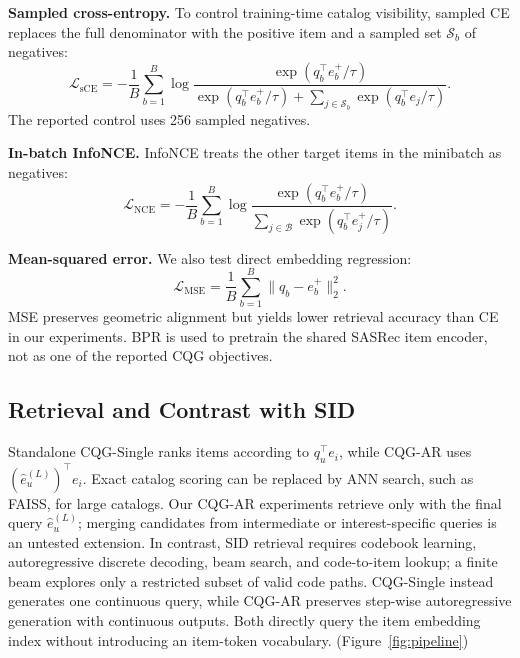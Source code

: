 \documentclass[letterpaper]{article}
\begin{document}
\textbf{Sampled cross-entropy.}
To control training-time catalog visibility, sampled CE replaces the full
denominator with the positive item and a sampled set
\(\mathcal S_b\) of negatives:
\begin{equation}
\mathcal{L}_{\mathrm{sCE}}
=-\frac{1}{B}\sum_{b=1}^{B}\log
\frac{\exp(q_b^\top e_b^+/\tau)}
{\exp(q_b^\top e_b^+/\tau)+
\sum_{j\in\mathcal S_b}\exp(q_b^\top e_j/\tau)} .
\end{equation}
The reported control uses 256 sampled negatives.

\textbf{In-batch InfoNCE.}
InfoNCE treats the other target items in the minibatch as negatives:
\begin{equation}
\mathcal{L}_{\mathrm{NCE}}
=-\frac{1}{B}\sum_{b=1}^{B}\log
\frac{\exp(q_b^\top e_b^+/\tau)}
{\sum_{j\in\mathcal B}\exp(q_b^\top e_j^+/\tau)} .
\end{equation}

\textbf{Mean-squared error.}
We also test direct embedding regression:
\begin{equation}
\mathcal{L}_{\mathrm{MSE}}
=\frac{1}{B}\sum_{b=1}^{B}\|q_b-e_b^+\|_2^2 .
\end{equation}
MSE preserves geometric alignment but yields lower retrieval accuracy than CE
in our experiments. BPR is used to pretrain the shared SASRec item encoder,
not as one of the reported CQG objectives.

\subsection{Retrieval and Contrast with SID}

Standalone CQG-Single ranks items according to $q_u^\top e_i$, while CQG-AR uses $(\hat e_u^{(L)})^\top e_i$. Exact catalog scoring can be replaced by ANN search, such as FAISS, for large catalogs. Our CQG-AR experiments retrieve only with the final query \(\hat e_u^{(L)}\); merging candidates from intermediate or interest-specific queries is an untested extension. In contrast, SID retrieval requires codebook learning, autoregressive discrete decoding, beam search, and code-to-item lookup; a finite beam explores only a restricted subset of valid code paths. CQG-Single instead generates one continuous query, while CQG-AR preserves step-wise autoregressive generation with continuous outputs. Both directly query the item embedding index without introducing an item-token vocabulary. (Figure~\ref{fig:pipeline})

\end{document}
